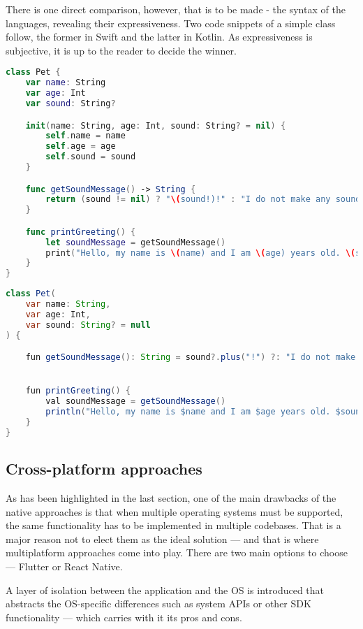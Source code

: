 \documentclass[
  digital,     %
  color,       %
  oneside,     %
  nosansbold,  %
  nocolorbold, %
  lof,         %
  lot,         %
]{fithesis4}
\begin{document}
There is one direct comparison, however, that is to be made - the syntax of the languages, revealing their expressiveness. Two code snippets of a simple class follow, the former in Swift and the latter in Kotlin. As expressiveness is subjective, it is up to the reader to decide the winner.

\begin{lstlisting}[language=Swift, caption={Swift example}]
class Pet {
    var name: String
    var age: Int
    var sound: String?

    init(name: String, age: Int, sound: String? = nil) {
        self.name = name
        self.age = age
        self.sound = sound
    }

    func getSoundMessage() -> String {
        return (sound != nil) ? "\(sound!)!" : "I do not make any sound..."
    }

    func printGreeting() {
        let soundMessage = getSoundMessage()
        print("Hello, my name is \(name) and I am \(age) years old. \(soundMessage)")
    }
}
\end{lstlisting}

\begin{lstlisting}[language=Java, caption={Kotlin example}]
class Pet(
    var name: String,
    var age: Int,
    var sound: String? = null
) {

    fun getSoundMessage(): String = sound?.plus("!") ?: "I do not make any sound..."


    fun printGreeting() {
        val soundMessage = getSoundMessage()
        println("Hello, my name is $name and I am $age years old. $soundMessage")
    }
}
\end{lstlisting}

\subsection{Cross-platform approaches}
As has been highlighted in the last section, one of the main drawbacks of the native approaches is that when multiple operating systems must be supported, the same functionality has to be implemented in multiple codebases. That is a major reason not to elect them as the ideal solution --- and that is where multiplatform approaches come into play. There are two main options to choose --- Flutter or React Native.

A layer of isolation between the application and the OS is introduced that abstracts the OS-specific differences such as system APIs or other SDK functionality --- which carries with it its pros and cons.
\end{document}
